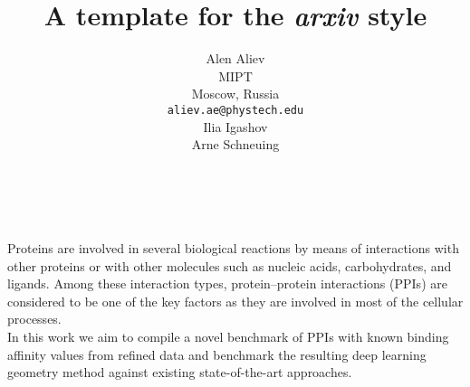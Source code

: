 \documentclass{article}
\title{A template for the \emph{arxiv} style}
\author{ Alen Aliev	\\
	MIPT\\
	Moscow, Russia \\
	\texttt{aliev.ae@phystech.edu} \\
	\And
	Ilia Igashov\\
	\And
	Arne Schneuing
	\\
	\\
	\texttt{} \\
}
\date{}
\begin{document}
\maketitle

Proteins are involved in several biological reactions by means of interactions with other proteins or
with other molecules such as nucleic acids, carbohydrates, and ligands. Among these interaction
types, protein–protein interactions (PPIs) are considered to be one of the key factors as they are
involved in most of the cellular processes. \\
In this work we aim to compile a novel benchmark of PPIs with known binding affinity values from refined data and benchmark the resulting deep learning geometry method against existing state-of-the-art approaches.
\end{document}
